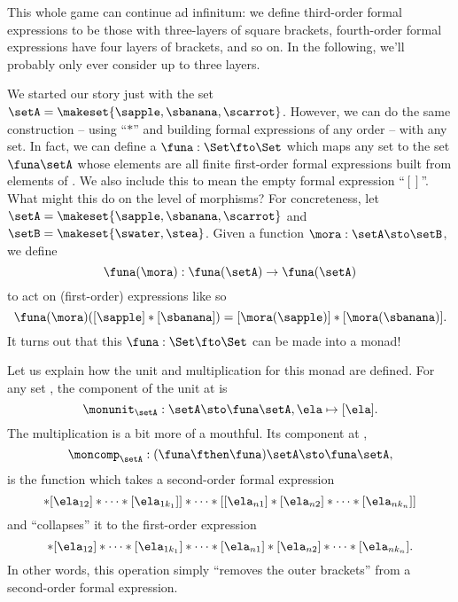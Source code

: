 This whole game can continue ad infinitum: we define third-order formal expressions to be those with three-layers of square brackets, fourth-order formal expressions have four layers of brackets, and so on.
In the following, we'll probably only ever consider up to three layers.

We started our story just with the set $\setA = \makeset{ \sapple, \sbanana, \scarrot }$.
However, we can do the same construction -- using ``$*$'' and building formal expressions of any order -- with any set.
In fact, we can define a  $\funa: \Set \fto \Set$ which maps any set \setA to the set $\funa \setA$ whose elements are all finite first-order formal expressions built from elements of \setA.
We also include this to mean the empty formal expression ``$[ ]$''.
What might this  do on the level of morphisms?
For concreteness, let $\setA = \makeset{ \sapple, \sbanana, \scarrot } $ and $\setB = \makeset{ \swater, \stea }$.
Given a function $\mora: \setA \sto \setB$, we define
\begin{equation}
    \funa(\mora) : \funa(\setA) \to \funa(\setA)
\end{equation}
to act on (first-order) expressions like so
\begin{equation}
    \funa(\mora)([\sapple]*[\sbanana]) = [\mora(\sapple)]*[\mora(\sbanana)].
\end{equation}
It turns out that this  $\funa: \Set \fto \Set$ can be made into a monad!

Let us explain how the unit and multiplication for this monad are defined.
For any set \setA, the component of the unit at \setA is
\begin{equation}
    \monunit_\setA : \setA \sto \funa \setA, \ela \mapsto [\ela].
\end{equation}
The multiplication is a bit more of a mouthful.
Its component at \setA,
\begin{equation}
    \moncomp_\setA : (\funa \fthen \funa)\setA \sto \funa \setA,
\end{equation}
is the function which takes a second-order formal expression
\begin{equation}
    [[\ela_{11}]* [\ela_{12}] * \cdots * [\ela_{1k_1}]] * \cdots * [[\ela_{n1}]* [\ela_{n2}] * \cdots * [\ela_{nk_n}]]
\end{equation}
and ``collapses'' it to the first-order expression
\begin{equation}
    [\ela_{11}]
    * [\ela_{12}] * \cdots * [\ela_{1k_1}] * \cdots * [\ela_{n1}]* [\ela_{n2}] * \cdots * [\ela_{nk_n}].
\end{equation}
In other words, this operation simply ``removes the outer brackets'' from a second-order formal expression.

